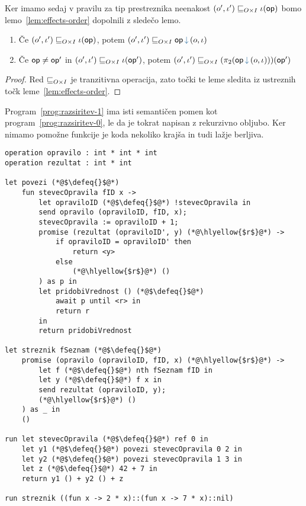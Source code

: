 Ker imamo sedaj v pravilu za tip prestreznika neenakost $(o', \iota') \sqsubseteq_{O \times I} \iota(\mathsf{op})$ bomo lemo~\ref{lem:effects-order} dopolnili z sledečo lemo.

\begin{lema}\label{lem:effects-order-2}
	\begin{enumerate}
		\item\label{lem:eo2-1} Če $(o', \iota') \sqsubseteq_{O \times I} \iota(\mathsf{op})$, potem $(\o', \i') \order{O \times I} \opincomp{\op}{(\o, \i)}$
		\item\label{lem:eo2-2} Če $\mathsf{op} \neq \mathsf{op}'$ in $(o', \iota') \sqsubseteq_{O \times I} \iota(\mathsf{op}')$, potem $(\o', \i') \order{O \times I} (\pi_2(\opincomp{\op}{(\o, \i)}))(\op')$
	\end{enumerate}
\end{lema}

\begin{proof}
	Red $\sqsubseteq_{O \times I}$ je tranzitivna operacija, zato točki te leme sledita iz ustreznih točk leme~\ref{lem:effects-order}.
\end{proof}


Program~\ref{prog:razsiritev-1} ima isti semantičen pomen kot program~\ref{prog:razsiritev-0}, le da je tokrat napisan z rekurzivno obljubo.
Ker nimamo pomožne funkcije je koda nekoliko krajša in tudi lažje berljiva.

\begin{lstlisting}[caption={Primer z rekurzivnim prestreznikom},label={prog:razsiritev-1},float,floatplacement=h]
operation opravilo : int * int * int
operation rezultat : int * int

let povezi (*@$\defeq{}$@*)
	fun stevecOpravila fID x ->
		let opraviloID (*@$\defeq{}$@*) !stevecOpravila in
		send opravilo (opraviloID, fID, x);
		stevecOpravila := opraviloID + 1;
		promise (rezultat (opraviloID', y) (*@\hlyellow{$r$}@*) ->
			if opraviloID = opraviloID' then
				return <y>
			else
				(*@\hlyellow{$r$}@*) ()
		) as p in
		let pridobiVrednost () (*@$\defeq{}$@*) 
			await p until <r> in
			return r
		in
		return pridobiVrednost

let streznik fSeznam (*@$\defeq{}$@*)
	promise (opravilo (opraviloID, fID, x) (*@\hlyellow{$r$}@*) ->
		let f (*@$\defeq{}$@*) nth fSeznam fID in
		let y (*@$\defeq{}$@*) f x in
		send rezultat (opraviloID, y);
		(*@\hlyellow{$r$}@*) ()
	) as _ in
	()

run	let stevecOpravila (*@$\defeq{}$@*) ref 0 in
	let y1 (*@$\defeq{}$@*) povezi stevecOpravila 0 2 in
	let y2 (*@$\defeq{}$@*) povezi stevecOpravila 1 3 in
	let z (*@$\defeq{}$@*) 42 + 7 in
	return y1 () + y2 () + z

run streznik ((fun x -> 2 * x)::(fun x -> 7 * x)::nil)
\end{lstlisting}


